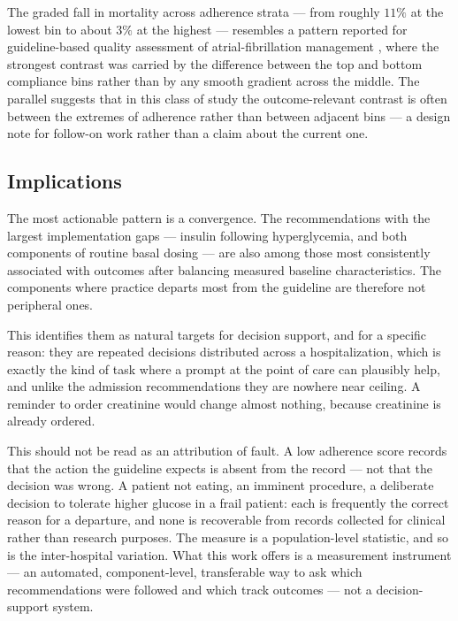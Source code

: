 The graded fall in mortality across adherence strata --- from roughly $11\%$ at the lowest bin to about $3\%$ at the highest --- resembles a pattern reported for guideline-based quality assessment of atrial-fibrillation management \citep{supporting-episodic-application-clinical-guidelines}, where the strongest contrast was carried by the difference between the top and bottom compliance bins rather than by any smooth gradient across the middle. The parallel suggests that in this class of study the outcome-relevant contrast is often between the extremes of adherence rather than between adjacent bins --- a design note for follow-on work rather than a claim about the current one.

\subsection{Implications}

The most actionable pattern is a convergence. The recommendations with the largest implementation gaps --- insulin following hyperglycemia, and both components of routine basal dosing --- are also among those most consistently associated with outcomes after balancing measured baseline characteristics. The components where practice departs most from the guideline are therefore not peripheral ones.

This identifies them as natural targets for decision support, and for a specific reason: they are repeated decisions distributed across a hospitalization, which is exactly the kind of task where a prompt at the point of care can plausibly help, and unlike the admission recommendations they are nowhere near ceiling. A reminder to order creatinine would change almost nothing, because creatinine is already ordered.

This should not be read as an attribution of fault. A low adherence score records that the action the guideline expects is absent from the record --- not that the decision was wrong. A patient not eating, an imminent procedure, a deliberate decision to tolerate higher glucose in a frail patient: each is frequently the correct reason for a departure, and none is recoverable from records collected for clinical rather than research purposes. The measure is a population-level statistic, and so is the inter-hospital variation. What this work offers is a measurement instrument --- an automated, component-level, transferable way to ask which recommendations were followed and which track outcomes --- not a decision-support system.

